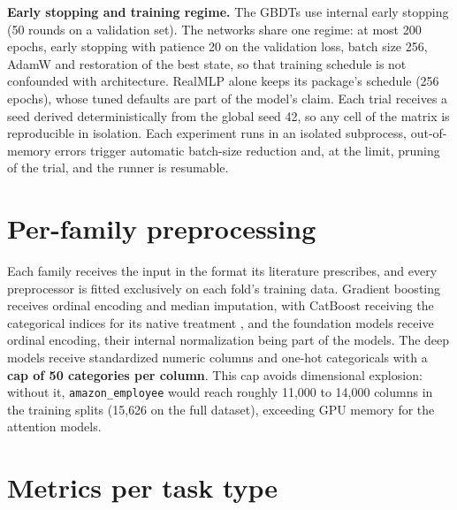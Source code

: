\textbf{Early stopping and training regime.} The GBDTs use internal
early stopping (50 rounds on a validation set). The networks share
one regime: at most 200 epochs, early stopping with patience 20 on
the validation loss, batch size 256, AdamW and restoration of the
best state, so that training schedule is not confounded with
architecture. RealMLP alone keeps its package's schedule (256
epochs), whose tuned defaults are part of the model's claim. Each
trial receives a seed derived deterministically from the global seed
42, so any cell of the matrix is reproducible in isolation. Each
experiment runs in an isolated subprocess, out-of-memory errors
trigger automatic batch-size reduction and, at the limit, pruning of
the trial, and the runner is resumable.

\section{Per-family preprocessing}
\label{sec:met-preproc}

Each family receives the input in the format its literature
prescribes, and every preprocessor is fitted exclusively on each
fold's training data. Gradient boosting receives ordinal encoding
and median imputation, with CatBoost receiving the categorical
indices for its native treatment \citep{prokhorenkova2018}, and the
foundation models receive ordinal encoding, their internal
normalization being part of the models. The deep models receive
standardized numeric columns and one-hot categoricals with a
\textbf{cap of 50 categories per column}. This cap avoids
dimensional explosion: without it,
\texttt{amazon\_\allowbreak employee} would reach roughly 11{,}000 to
14{,}000 columns in the training splits (15{,}626 on the full
dataset), exceeding GPU memory for the attention models.

\section{Metrics per task type}
\label{sec:met-metricas}


